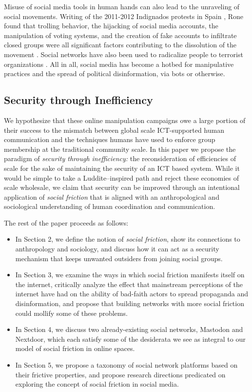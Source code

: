 \documentclass[sigconf,authordraft]{acmart}
\begin{document}
Misuse of social media tools in human hands can also lead to the unraveling of social movements. Writing of the 2011-2012 Indignados protests in Spain \cite{indignadosBBC}, Rone found that trolling behavior, the hijacking of social media accounts, the manipulation of voting systems, and the creation of fake accounts to infiltrate closed groups were all significant factors contributing to the dissolution of the movement \cite{rone2019fake}. Social networks have also been used to radicalize people to terrorist organizations \cite{o2007virtual,Thompson2011radicalization}. All in all, social media has become a hotbed for manipulative practices and the spread of political disinformation, via bots or otherwise\cite{benkler2018network}.

\subsection{Security through Inefficiency}

We hypothesize that these online manipulation campaigns owe a large portion of their success to the mismatch between global scale ICT-supported human communication and the techniques humans have used to enforce group membership at the traditional community scale. In this paper we propose the paradigm of \emph{security through inefficiency:} the reconsideration of efficiencies of scale for the sake of maintaining the security of an ICT based system. While it would be simple to take a Luddite--inspired path and reject these economies of scale wholesale, we claim that security can be improved through an intentional application of \emph{social friction} that is aligned with an anthropological and sociological understanding of human coordination and communication.

The rest of the paper proceeds as follows:

\begin{itemize}
\item In Section 2, we define the notion of \textit{social friction}, show its connections to anthropology and sociology, and discuss how it can act as a security mechanism that keeps unwanted outsiders from joining social groups.
\item In Section 3, we examine the ways in which social friction manifests itself on the internet, critically analyze the effect that mainstream perceptions of the internet have had on the ability of bad-faith actors to spread propaganda and disinformation, and propose that building networks with more social friction could mollify some of these problems.
\item In Section 4, we discuss two already-existing social networks, Mastodon and Nextdoor, which each satisfy some of the desiderata we see as integral to our model of social friction in online spaces.
\item In Section 5, we propose a taxonomy of social network platforms based on their frictive properties, and propose research directions predicated on exploring the concept of social friction in social media.
\end{itemize}
\end{document}
